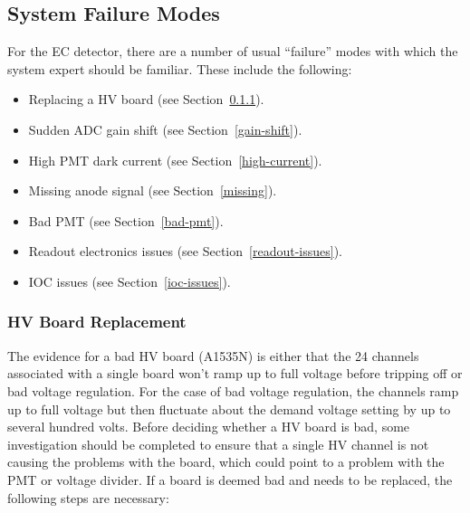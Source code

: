 \documentclass[letterpaper,10pt]{article}
\begin{document}
\subsection{System Failure Modes}
\label{repairs}

For the EC detector, there are a number of usual ``failure'' modes with which the system expert should
be familiar. These include the following:

\begin{itemize}
\item Replacing a HV board (see Section~\ref{board-swap}).
\item Sudden ADC gain shift (see Section~\ref{gain-shift}).
\item High PMT dark current (see Section~\ref{high-current}).
\item Missing anode signal (see Section~\ref{missing}).
\item Bad PMT (see Section~\ref{bad-pmt}).
\item Readout electronics issues (see Section~\ref{readout-issues}).
\item IOC issues (see Section~\ref{ioc-issues}).
\end{itemize}

\subsubsection{HV Board Replacement}
\label{board-swap}

The evidence for a bad HV board (A1535N) is either that the 24 channels associated with a single 
board won't ramp up to full voltage before tripping off or bad voltage regulation. For the case
of bad voltage regulation, the channels ramp up to full voltage but then fluctuate about the demand 
voltage setting by up to several hundred volts. Before deciding whether a HV board is bad, some
investigation should be completed to ensure that a single HV channel is not causing the problems
with the board, which could point to a problem with the PMT or voltage divider. If a board is deemed 
bad and needs to be replaced, the following steps are necessary:
\end{document}
